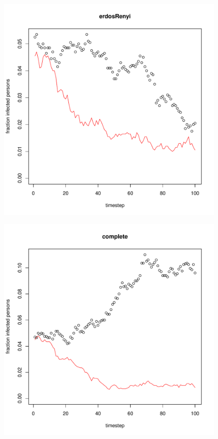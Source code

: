 \documentclass[paper=a4, fontsize=11pt]{scrartcl} %
\begin{document}
\begin{figure}[htbp] %
   \centering
   \includegraphics[width=\textwidth]{thresholdSimulation_erdosRenyi} 
   \label{erdosRenyi}
\end{figure}
\begin{figure}[htbp] %
   \centering
   \includegraphics[width=\textwidth]{thresholdSimulation_complete} 
   \label{complete}
\end{figure}
\end{document}
